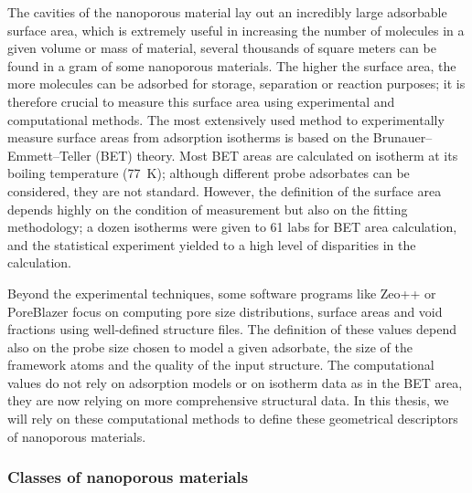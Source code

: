 \documentclass[main.tex]{subfiles}
\begin{document}
The cavities of the nanoporous material lay out an incredibly large adsorbable surface area, which is extremely useful in increasing the number of molecules in a given volume or mass of material, several thousands of square meters can be found in a gram of some nanoporous materials.\cite{Farha_2012} The higher the surface area, the more molecules can be adsorbed for storage, separation or reaction purposes; it is therefore crucial to measure this surface area using experimental and computational methods. The most extensively used method to experimentally measure surface areas from adsorption isotherms is based on the Brunauer–Emmett–Teller (BET) theory.\cite{Detsi_2011} Most BET areas are calculated on  isotherm at its boiling temperature (\SI{77}{\kelvin}); although different probe adsorbates can be considered, they are not standard.\cite{Tian_2017} However, the definition of the surface area depends highly on the condition of measurement but also on the fitting methodology; a dozen isotherms were given to 61 labs for BET area calculation, and the statistical experiment yielded to a high level of disparities in the calculation.\cite{Osterrieth_2022} 

Beyond the experimental techniques, some software programs like Zeo++ or PoreBlazer focus on computing pore size distributions, surface areas and void fractions using well-defined structure files.\cite{Zeo++,PoreBlazer} The definition of these values depend also on the probe size chosen to model a given adsorbate, the size of the framework atoms and the quality of the input structure. The computational values do not rely on adsorption models or on isotherm data as in the BET area, they are now relying on more comprehensive structural data. In this thesis, we will rely on these computational methods to define these geometrical descriptors of nanoporous materials.

\subsubsection{Classes of nanoporous materials}

\end{document}
